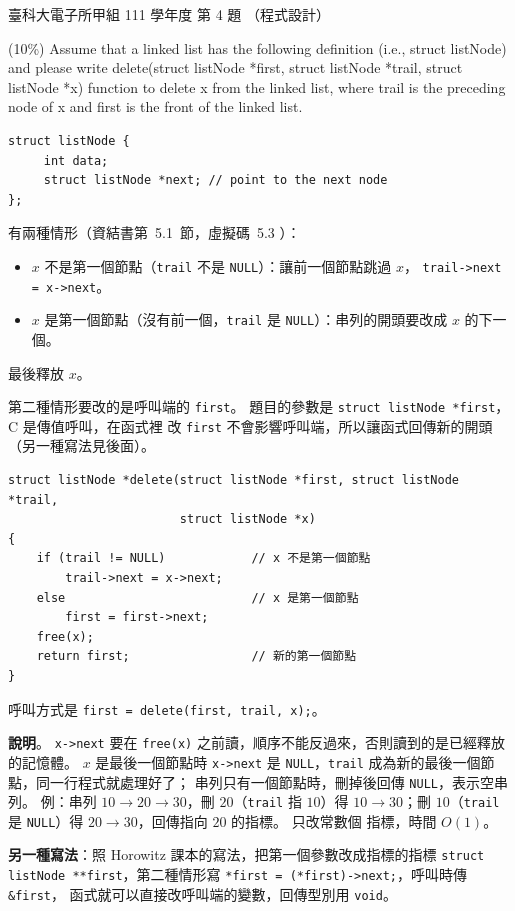 \begin{pastexam}[label={px:ntust-111-et-ds-04}]{臺科大電子所甲組 111 學年度 第 4 題}
（程式設計）

(10\%) Assume that a linked list has the following definition (i.e., struct listNode) and please
write delete(struct listNode *first, struct listNode *trail, struct listNode *x) function to delete x
from the linked list, where trail is the preceding node of x and first is the front of the linked list.
\begin{verbatim}
struct listNode {
     int data;
     struct listNode *next; // point to the next node
};
\end{verbatim}
\end{pastexam}

\begin{pastsoln}
有兩種情形（資結書第~5.1~節，虛擬碼~5.3 ）：
\begin{itemize}
\item $x$ 不是第一個節點（\texttt{trail} 不是 \texttt{NULL}）：讓前一個節點跳過 $x$，
\texttt{trail->next = x->next}。
\item $x$ 是第一個節點（沒有前一個，\texttt{trail} 是 \texttt{NULL}）：串列的開頭要改成 $x$ 的下一個。
\end{itemize}
最後釋放 $x$。

第二種情形要改的是呼叫端的 \texttt{first}。 題目的參數是 \texttt{struct listNode *first}，C 是傳值呼叫，在函式裡
改 \texttt{first} 不會影響呼叫端，所以讓函式回傳新的開頭（另一種寫法見後面）。

\begin{verbatim}
struct listNode *delete(struct listNode *first, struct listNode *trail,
                        struct listNode *x)
{
    if (trail != NULL)            // x 不是第一個節點
        trail->next = x->next;
    else                          // x 是第一個節點
        first = first->next;
    free(x);
    return first;                 // 新的第一個節點
}
\end{verbatim}
呼叫方式是 \texttt{first = delete(first, trail, x);}。

\textbf{說明}。 \texttt{x->next} 要在 \texttt{free(x)} 之前讀，順序不能反過來，否則讀到的是已經釋放的記憶體。
$x$ 是最後一個節點時 \texttt{x->next} 是 \texttt{NULL}，\texttt{trail} 成為新的最後一個節點，同一行程式就處理好了；
串列只有一個節點時，刪掉後回傳 \texttt{NULL}，表示空串列。 例：串列 $10 \to 20 \to 30$，刪 $20$（\texttt{trail} 指
$10$）得 $10 \to 30$；刪 $10$（\texttt{trail} 是 \texttt{NULL}）得 $20 \to 30$，回傳指向 $20$ 的指標。 只改常數個
指標，時間 $O(1)$。

\textbf{另一種寫法}：照 Horowitz 課本的寫法，把第一個參數改成指標的指標
\texttt{struct listNode **first}，第二種情形寫 \texttt{*first = (*first)->next;}，呼叫時傳 \texttt{\&first}，
函式就可以直接改呼叫端的變數，回傳型別用 \texttt{void}。
\end{pastsoln}
